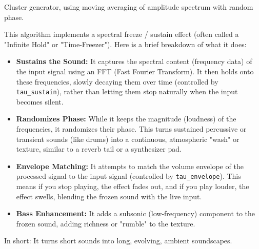Cluster generator, using moving averaging of amplitude spectrum with random phase.

This algorithm implements a spectral freeze / sustain effect (often called a "Infinite Hold" or "Time-Freezer").
Here is a brief breakdown of what it does:

\begin{itemize}
\item {\bf Sustains the Sound:} It captures the spectral content
  (frequency data) of the input signal using an FFT (Fast Fourier
  Transform). It then holds onto these frequencies, slowly decaying
  them over time (controlled by \verb!tau_sustain!), rather than letting them
  stop naturally when the input becomes silent.
\item {\bf Randomizes Phase:} While it keeps the magnitude (loudness)
  of the frequencies, it randomizes their phase. This turns sustained
  percussive or transient sounds (like drums) into a continuous,
  atmospheric "wash" or texture, similar to a reverb tail or a
  synthesizer pad.
\item {\bf Envelope Matching:} It attempts to match the volume
  envelope of the processed signal to the input signal (controlled by
  \verb!tau_envelope!). This means if you stop playing, the effect fades out,
  and if you play louder, the effect swells, blending the frozen sound
  with the live input.
\item {\bf Bass Enhancement:} It adds a subsonic (low-frequency)
  component to the frozen sound, adding richness or "rumble" to the
  texture.
\end{itemize}

In short: It turns short sounds into long, evolving, ambient soundscapes.




